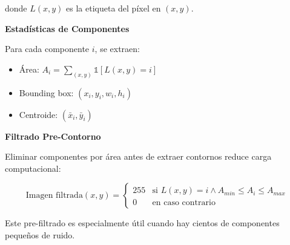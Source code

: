 donde $L(x,y)$ es la etiqueta del píxel en $(x,y)$.

\textbf{Estadísticas de Componentes}

Para cada componente $i$, se extraen:
\begin{itemize}
\item Área: $A_i = \sum_{(x,y)} \mathbb{1}[L(x,y) = i]$
\item Bounding box: $(x_i, y_i, w_i, h_i)$
\item Centroide: $(\bar{x}_i, \bar{y}_i)$
\end{itemize}

\textbf{Filtrado Pre-Contorno}

Eliminar componentes por área antes de extraer contornos reduce carga computacional:

\begin{equation}
\text{Imagen filtrada}(x,y) = \begin{cases}
255 & \text{si } L(x,y) = i \land A_{min} \leq A_i \leq A_{max} \\
0 & \text{en caso contrario}
\end{cases}
\end{equation}

Este pre-filtrado es especialmente útil cuando hay cientos de componentes pequeños de ruido.
